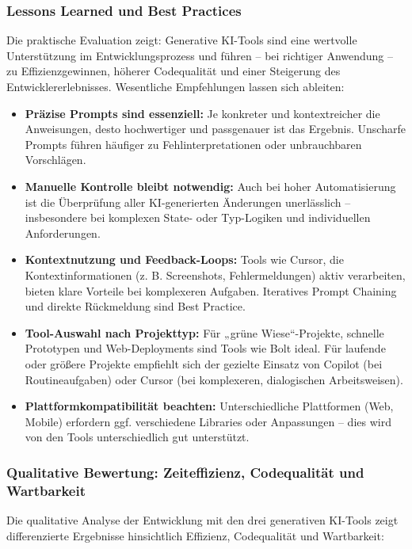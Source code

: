 \subsubsection{Lessons Learned und Best Practices}

Die praktische Evaluation zeigt: Generative KI-Tools sind eine wertvolle
Unterstützung im Entwicklungsprozess und führen – bei richtiger Anwendung – zu
Effizienzgewinnen, höherer Codequalität und einer Steigerung des
Entwicklererlebnisses. Wesentliche Empfehlungen lassen sich ableiten:

\begin{itemize}
      \item \textbf{Präzise Prompts sind essenziell:} Je konkreter und kontextreicher die Anweisungen, desto hochwertiger und passgenauer ist das Ergebnis. Unscharfe Prompts führen häufiger zu Fehlinterpretationen oder unbrauchbaren Vorschlägen.
      \item \textbf{Manuelle Kontrolle bleibt notwendig:} Auch bei hoher Automatisierung ist die Überprüfung aller KI-generierten Änderungen unerlässlich – insbesondere bei komplexen State- oder Typ-Logiken und individuellen Anforderungen.
      \item \textbf{Kontextnutzung und Feedback-Loops:} Tools wie Cursor, die Kontextinformationen (z. B. Screenshots, Fehlermeldungen) aktiv verarbeiten, bieten klare Vorteile bei komplexeren Aufgaben. Iteratives Prompt Chaining und direkte Rückmeldung sind Best Practice.
      \item \textbf{Tool-Auswahl nach Projekttyp:} Für „grüne Wiese“-Projekte, schnelle Prototypen und Web-Deployments sind Tools wie Bolt ideal. Für laufende oder größere Projekte empfiehlt sich der gezielte Einsatz von Copilot (bei Routineaufgaben) oder Cursor (bei komplexeren, dialogischen Arbeitsweisen).
      \item \textbf{Plattformkompatibilität beachten:} Unterschiedliche Plattformen (Web, Mobile) erfordern ggf. verschiedene Libraries oder Anpassungen – dies wird von den Tools unterschiedlich gut unterstützt.
\end{itemize}

\subsubsection{Qualitative Bewertung: Zeiteffizienz, Codequalität und Wartbarkeit}

Die qualitative Analyse der Entwicklung mit den drei generativen KI-Tools zeigt
differenzierte Ergebnisse hinsichtlich Effizienz, Codequalität und Wartbarkeit:

